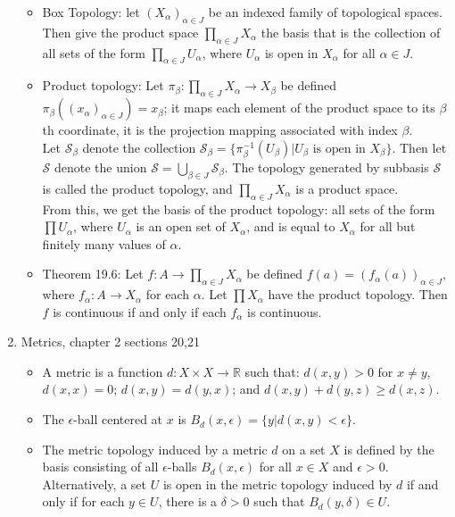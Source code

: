 \documentclass[12pt,letterpaper]{article}
\begin{document}
\begin{enumerate}
\begin{itemize}
    \item Box Topology: let $(X_\alpha)_{\alpha\in J}$ be an indexed family of topological spaces. Then give the product space $\displaystyle\prod_{\alpha\in J}X_\alpha$ the basis that is the collection of all sets of the form $\displaystyle\prod_{\alpha\in J}U_\alpha$, where $U_\alpha$ is open in $X_\alpha$ for all $\alpha\in J$.
    \item Product topology: Let $\pi_\beta : \displaystyle\prod_{\alpha\in J}X_\alpha \rightarrow X_\beta$ be defined $\pi_\beta((x_\alpha)_{\alpha\in J}) = x_\beta$; it maps each element of the product space to its $\beta$th coordinate, it is the projection mapping associated with index $\beta$. \\
    Let $\mathcal{S}_\beta$ denote the collection $\mathcal{S}_\beta = \{\pi_\beta^{-1}(U_\beta) | U_\beta \text{ is open in } X_\beta\}$. Then let $\mathcal{S}$ denote the union $\mathcal{S}=\displaystyle\bigcup_{\beta\in J}\mathcal{S}_\beta$. The topology generated by subbasis $\mathcal{S}$ is called the product topology, and $\prod_{\alpha\in J} X_\alpha$ is a product space.\\
    From this, we get the basis of the product topology: all sets of the form $\prod U_\alpha$, where $U_\alpha$ is an open set of $X_\alpha$, and is equal to $X_\alpha$ for all but finitely many values of $\alpha$.
    \item \label{thm:MapsProducts19.6} Theorem 19.6: Let $f: A \rightarrow \prod_{\alpha\in J}X_\alpha$ be defined $f(a) = (f_\alpha(a))_{\alpha \in J}$, where $f_\alpha : A \rightarrow X_\alpha$ for each $\alpha$. Let $\prod X_\alpha$ have the product topology. Then $f$ is continuous if and only if each $f_\alpha$ is continuous.
  \end{itemize}
  \item \label{dfn:metric} Metrics, chapter 2 sections 20,21
  \begin{itemize}
    \item A metric is a function $d: X \times X \rightarrow \mathbb{R}$ such that: $d(x,y)>0$ for $x\neq y$, $d(x,x)=0$; $d(x,y)=d(y,x)$; and $d(x,y) + d(y,z)\geq d(x,z)$.
    \item The $\epsilon$-ball centered at $x$ is $B_d(x, \epsilon) = \{ y | d(x,y) < \epsilon \}$.
    \item \label{dfn:metricTopology} The metric topology induced by a metric $d$ on a set $X$ is defined by the basis consisting of all $\epsilon$-balls $B_d(x,\epsilon)$ for all $x\in X$ and $\epsilon > 0$. Alternatively, a set $U$ is open in the metric topology induced by $d$ if and only if for each $y\in U$, there is a $\delta > 0$ such that $B_d(y,\delta) \in U$.

\end{itemize}
\end{enumerate}
\end{document}
